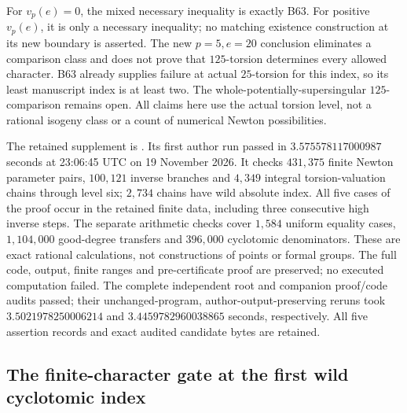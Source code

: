 \begin{remark}
\label{rem:B-RD76-scope}
For \(v_p(e)=0\), the mixed necessary inequality is exactly B63.
For positive \(v_p(e)\), it is only a necessary inequality; no
matching existence construction at its new boundary is asserted.
The new \(p=5,e=20\) conclusion eliminates a comparison class
and does not prove that \(125\)-torsion determines every allowed
character. B63 already supplies failure at actual \(25\)-torsion
for this index, so its least manuscript index is at least two.
The whole-potentially-supersingular \(125\)-comparison remains
open. All claims here use the actual torsion level, not a rational
isogeny class or a count of numerical Newton possibilities.

The retained supplement is
.
Its first author run passed in \(3.575578117000987\) seconds
at 23:06:45 UTC on 19 November 2026. It checks \(431{,}375\)
finite Newton parameter pairs, \(100{,}121\) inverse branches
and \(4{,}349\) integral torsion-valuation chains through level
six; \(2{,}734\) chains have wild absolute index. All five
cases of the proof occur in the retained finite data, including
three consecutive high inverse steps. The separate arithmetic
checks cover \(1{,}584\) uniform equality cases,
\(1{,}104{,}000\) good-degree transfers and \(396{,}000\)
cyclotomic denominators. These are exact rational calculations,
not constructions of points or formal groups. The full code,
output, finite ranges and pre-certificate proof are preserved;
no executed computation failed.
The complete independent root and companion proof/code audits
passed; their unchanged-program, author-output-preserving reruns
took \(3.5021978250006214\) and \(3.4459782960038865\) seconds,
respectively. All five assertion records and exact audited
candidate bytes are retained.
\end{remark}


\subsection{The finite-character gate at the first wild cyclotomic index}

